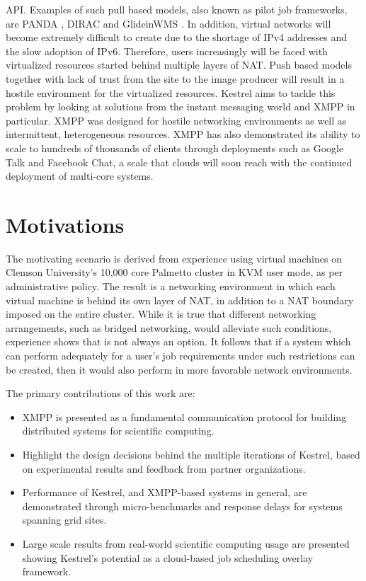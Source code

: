 API. Examples of such pull based models, also known as pilot job frameworks,
are PANDA \cite{Maeno2008}, DIRAC \cite{Tsaregorodtsev2004} and GlideinWMS
\cite{Sfiligoi2008}. In addition, virtual networks will become extremely
difficult to create due to the shortage of IPv4 addresses and the slow adoption
of IPv6. Therefore, users increasingly will be faced with virtualized
resources started behind multiple layers of NAT. Push based models together with
lack of trust from the site to the image producer will result in a hostile
environment for the virtualized resources. Kestrel aims to tackle this problem
by looking at solutions from the instant messaging world and XMPP in particular.
XMPP was designed for hostile networking environments as well as intermittent,
heterogeneous resources. XMPP has also demonstrated its ability to scale to
hundreds of thousands of clients through deployments such as Google Talk and
Facebook Chat, a scale that clouds will soon reach with the continued deployment
of multi-core systems.

\section{Motivations}
The motivating scenario is derived from experience using virtual machines on
Clemson University's 10,000 core Palmetto cluster in KVM user mode, as per
administrative policy. The result is a networking environment in which each
virtual machine is behind its own layer of NAT, in addition to a NAT boundary
imposed on the entire cluster. While it is true that different networking
arrangements, such as bridged networking, would alleviate such conditions,
experience shows that is not always an option. It follows that if a system which
can perform adequately for a user's job requirements under such restrictions can
be created, then it would also perform in more favorable network environments.

The primary contributions of this work are:
\begin{itemize}
\item XMPP is presented as a fundamental communication protocol for
building distributed systems for scientific computing.
\item Highlight the design decisions behind the multiple iterations
of Kestrel, based on experimental results and feedback from partner
organizations.
\item Performance of Kestrel, and XMPP-based systems in general,
are demonstrated through micro-benchmarks and response delays for
systems spanning grid sites.
\item Large scale results from real-world scientific computing usage
are presented showing Kestrel's potential as a cloud-based job
scheduling overlay framework.
\end{itemize}

